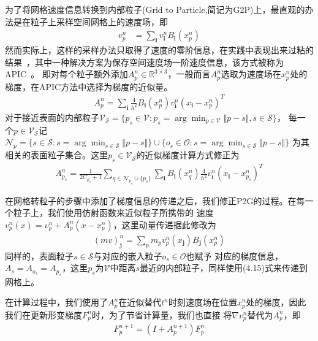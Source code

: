 为了将网格速度信息转换到内部粒子(Grid to Particle,简记为G2P)上，最直观的办法是在粒子上采样空间网格上的速度场，即
\begin{align}
    v_p^n &= \sum_{\mathbf{i}} v_{\mathbf{i}}^n B_{\mathbf{i}}(x_p^n)
\end{align}
然而实际上，这样的采样办法只取得了速度的零阶信息，在实践中表现出来过粘的结果~\cite{tskhakaya2007particle}，其中一种解决方案为保存空间速度场一阶速度信息，该方式被称为APIC~\cite{jiang2015affine}。
即对每个粒子额外添加$A_p^n \in \mathbb{R}^{3\times 3}$，一般而言$A_p^n$选取为速度场在$x_p^n$处的梯度，在APIC方法中选择为梯度的近似量。
\begin{align}
    A_p^n = \sum_{\mathbf{i}} \frac{4}{h^2}B_{\mathbf{i}}(x_p^n)v_{\mathbf{i}}^n(x_\mathbf{i} - x_p^n)^T
\end{align}
对于接近表面的内部粒子$\mathcal{V}_{\mathcal{S}} = \{p_s \in \mathcal{V}:p_s = \arg\min_{p \in \mathcal{V}} \Vert p - s\Vert, s\in \mathcal{S}\}$，
每一个$p\in \mathcal{V}_{\mathcal{S}}$记$\mathcal{N}_{p} = \{s\in \mathcal{S}:s = \arg\min_{s\in \mathcal{S}}\Vert p - s\Vert\}\cup \{o_s \in \mathcal{O}:s = \arg\min_{s\in \mathcal{S}}\Vert p - s\Vert\}$
为其相关的表面粒子集合。这里$p_s \in \mathcal{V}_\mathcal{S}$的近似梯度计算方式修正为
\begin{align}
    A_{p_s}^n = \frac{1}{2C_{p_s} + 1}\sum_{q \in \mathcal{N}_{p_s}\cup \{p_s\}}\sum_{\mathbf{i}} B_{\mathbf{i}}(x_q^n)\frac{4}{h^2}v_{\mathbf{i}}^n(x_\mathbf{i} - x_{p_s}^n)^T
\end{align}

在网格转粒子的步骤中添加了梯度信息的传递之后，我们修正P2G的过程。在每一个粒子上，我们使用仿射函数来近似粒子所携带的
速度$v_p^n(x) = v_p^n + A_p^n(x - x_p^n)$，这里动量传递据此修改为
\begin{align}
    (mv)_{\mathbf{j}}^n = \sum_{p}m_pv_p^n(x_\mathbf{j})B_{\mathbf{j}}(x_p^n)
\end{align}
同样的，表面粒子$s\in \mathcal{S}$与对应的嵌入粒子$o_s \in \mathcal{O}$也赋予
对应的梯度信息，$A_s = A_{o_s} = A_{p_s}$，这里$p_s$为$\mathcal{V}$中距离$s$最近的内部粒子，同样使用(4.15)式来传递到网格上。

在计算过程中，我们使用了$A_p^n$在近似替代$t^n$时刻速度场在位置$x_p^n$处的梯度，因此我们在更新形变梯度$F^n_p$时，为了节省计算量，我们也直接
将$\nabla v^n_p$替代为$A_p^n$，即
\begin{align}
    F_p^{n+1} = (I + A_p^{n+1})F_p^n
\end{align}
